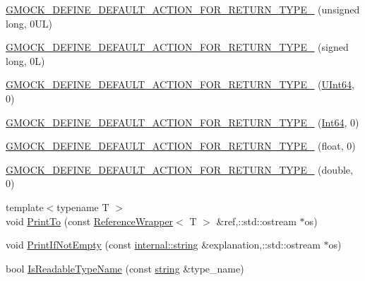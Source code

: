 \begin{DoxyCompactItemize}
\item 
\hyperlink{namespacetesting_1_1internal_a1f4167b954a7ff0074ce8a5bb855f86f}{G\+M\+O\+C\+K\+\_\+\+D\+E\+F\+I\+N\+E\+\_\+\+D\+E\+F\+A\+U\+L\+T\+\_\+\+A\+C\+T\+I\+O\+N\+\_\+\+F\+O\+R\+\_\+\+R\+E\+T\+U\+R\+N\+\_\+\+T\+Y\+P\+E\+\_\+} (unsigned long, 0\+U\+L)
\item 
\hyperlink{namespacetesting_1_1internal_ad8804e25537427755c324ab03a72e776}{G\+M\+O\+C\+K\+\_\+\+D\+E\+F\+I\+N\+E\+\_\+\+D\+E\+F\+A\+U\+L\+T\+\_\+\+A\+C\+T\+I\+O\+N\+\_\+\+F\+O\+R\+\_\+\+R\+E\+T\+U\+R\+N\+\_\+\+T\+Y\+P\+E\+\_\+} (signed long, 0\+L)
\item 
\hyperlink{namespacetesting_1_1internal_ad2efcdbd12c7c020745b87bcc0997809}{G\+M\+O\+C\+K\+\_\+\+D\+E\+F\+I\+N\+E\+\_\+\+D\+E\+F\+A\+U\+L\+T\+\_\+\+A\+C\+T\+I\+O\+N\+\_\+\+F\+O\+R\+\_\+\+R\+E\+T\+U\+R\+N\+\_\+\+T\+Y\+P\+E\+\_\+} (\hyperlink{namespacetesting_1_1internal_aa6a1ac454e6d7e550fa4925c62c35caa}{U\+Int64}, 0)
\item 
\hyperlink{namespacetesting_1_1internal_ab427739121a380a7934bda96153f053d}{G\+M\+O\+C\+K\+\_\+\+D\+E\+F\+I\+N\+E\+\_\+\+D\+E\+F\+A\+U\+L\+T\+\_\+\+A\+C\+T\+I\+O\+N\+\_\+\+F\+O\+R\+\_\+\+R\+E\+T\+U\+R\+N\+\_\+\+T\+Y\+P\+E\+\_\+} (\hyperlink{namespacetesting_1_1internal_a271c563fec38b804ddab0677f51f70a8}{Int64}, 0)
\item 
\hyperlink{namespacetesting_1_1internal_a71c697e5b567365fd3ff6c720769633b}{G\+M\+O\+C\+K\+\_\+\+D\+E\+F\+I\+N\+E\+\_\+\+D\+E\+F\+A\+U\+L\+T\+\_\+\+A\+C\+T\+I\+O\+N\+\_\+\+F\+O\+R\+\_\+\+R\+E\+T\+U\+R\+N\+\_\+\+T\+Y\+P\+E\+\_\+} (float, 0)
\item 
\hyperlink{namespacetesting_1_1internal_a7ba92aa33f4968c902623cd02e445020}{G\+M\+O\+C\+K\+\_\+\+D\+E\+F\+I\+N\+E\+\_\+\+D\+E\+F\+A\+U\+L\+T\+\_\+\+A\+C\+T\+I\+O\+N\+\_\+\+F\+O\+R\+\_\+\+R\+E\+T\+U\+R\+N\+\_\+\+T\+Y\+P\+E\+\_\+} (double, 0)
\item 
{\footnotesize template$<$typename T $>$ }\\void \hyperlink{namespacetesting_1_1internal_a880d891d434f918b29a382f90e47cecb}{Print\+To} (const \hyperlink{classtesting_1_1internal_1_1_reference_wrapper}{Reference\+Wrapper}$<$ T $>$ \&ref,\+::std\+::ostream $\ast$os)
\item 
void \hyperlink{namespacetesting_1_1internal_a77c9e2b66d2b2414db4763971180d53c}{Print\+If\+Not\+Empty} (const \hyperlink{namespacetesting_1_1internal_a8e8ff5b11e64078831112677156cb111}{internal\+::string} \&explanation,\+::std\+::ostream $\ast$os)
\item 
bool \hyperlink{namespacetesting_1_1internal_a19a5d50382569ce6ee94e2b68ddc6fc7}{Is\+Readable\+Type\+Name} (const \hyperlink{namespacetesting_1_1internal_a8e8ff5b11e64078831112677156cb111}{string} \&type\+\_\+name)

\end{DoxyCompactItemize}
